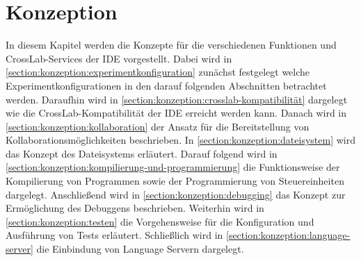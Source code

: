 \chapter{Konzeption}\label{section:konzeption}

In diesem Kapitel werden die Konzepte für die verschiedenen Funktionen und CrossLab-Services der IDE vorgestellt. Dabei wird in \autoref{section:konzeption:experimentkonfiguration} zunächst festgelegt welche Experimentkonfigurationen in den darauf folgenden Abschnitten betrachtet werden. Daraufhin wird in \autoref{section:konzeption:crosslab-kompatibilität} dargelegt wie die CrossLab-Kompatibilität der IDE erreicht werden kann. Danach wird in \autoref{section:konzeption:kollaboration} der Ansatz für die Bereitstellung von Kollaborationsmöglichkeiten beschrieben. In \autoref{section:konzeption:dateisystem} wird das Konzept des Dateisystems erläutert. Darauf folgend wird in \autoref{section:konzeption:kompilierung-und-programmierung} die Funktionsweise der Kompilierung von Programmen sowie der Programmierung von Steuereinheiten dargelegt. Anschließend wird in \autoref{section:konzeption:debugging} das Konzept zur Ermöglichung des Debuggens beschrieben. Weiterhin wird in \autoref{section:konzeption:testen} die Vorgehensweise für die Konfiguration und Ausführung von Tests erläutert. Schließlich wird in \autoref{section:konzeption:language-server} die Einbindung von Language Servern dargelegt.









